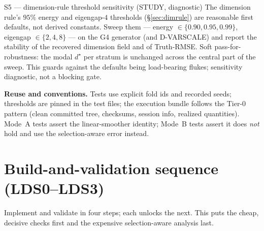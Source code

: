 \documentclass[11pt]{article}
\begin{document}
\begin{gate}{S5 --- dimension-rule threshold sensitivity (STUDY, diagnostic)}
The dimension rule's $95\%$ energy and eigengap-$4$ thresholds (\S\ref{sec:dimrule}) are
reasonable first defaults, not derived constants. Sweep them --- energy
$\in\{0.90,0.95,0.99\}$, eigengap $\in\{2,4,8\}$ --- on the G4 generator (and D-VARSCALE)
and report the stability of the recovered dimension field and of Truth-RMSE. Soft
pass-for-robustness: the modal $d^\star$ per stratum is unchanged across the central part
of the sweep. This guards against the defaults being load-bearing flukes; sensitivity
diagnostic, not a blocking gate.
\end{gate}

\noindent\textbf{Reuse and conventions.} Tests use explicit fold ids and recorded
seeds; thresholds are pinned in the test files; the execution bundle follows the
Tier-0 pattern (clean committed tree, checksums, session info, realized quantities).
Mode~A tests assert the linear-smoother identity; Mode~B tests assert it does
\emph{not} hold and use the selection-aware error instead.

\section{Build-and-validation sequence (LDS0--LDS3)}\label{sec:sequence}

Implement and validate in four steps; each unlocks the next. This puts the cheap, decisive
checks first and the expensive selection-aware analysis last.
\end{document}
